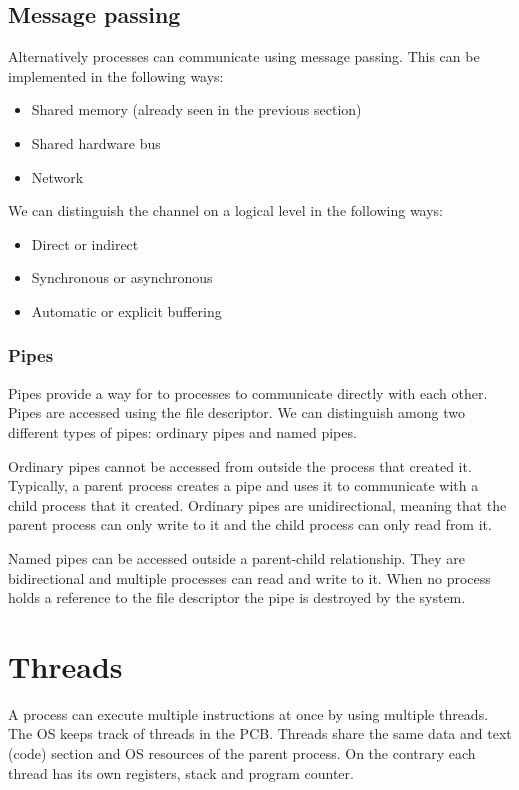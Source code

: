 \subsection{Message passing}
Alternatively processes can communicate using message passing. This can be implemented in the following ways:
\begin{itemize}
  \item Shared memory (already seen in the previous section)
  \item Shared hardware bus
  \item Network
\end{itemize}
We can distinguish the channel on a logical level in the following ways:
\begin{itemize}
  \item Direct or indirect
  \item Synchronous or asynchronous
  \item Automatic or explicit buffering
\end{itemize}

\subsubsection{Pipes}
Pipes provide a way for to processes to communicate directly with each other. Pipes are accessed using the file descriptor. We can distinguish among two different types of pipes: ordinary pipes and named pipes.

Ordinary pipes cannot be accessed from outside the process that created it. Typically, a parent process creates a pipe and uses it to communicate with a child process that it created. Ordinary pipes are unidirectional, meaning that the parent process can only write to it and the child process can only read from it.


Named pipes can be accessed outside a parent-child relationship. They are bidirectional and multiple processes can read and write to it. When no process holds a reference to the file descriptor the pipe is destroyed by the system.


\section{Threads}
A process can execute multiple instructions at once by using multiple threads. The OS keeps track of threads in the PCB. Threads share the same data and text (code) section and OS resources of the parent process. On the contrary each thread has its own registers, stack and program counter.

